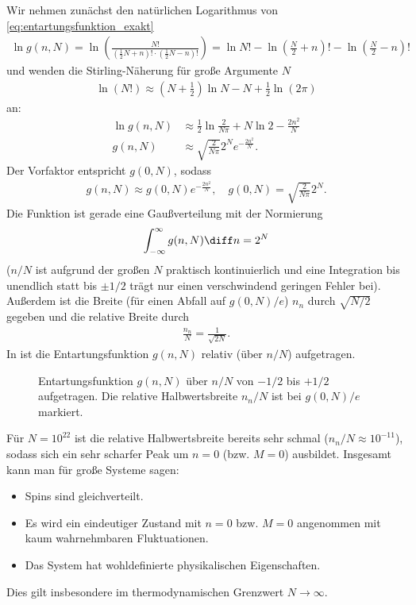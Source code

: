 Wir nehmen zunächst den natürlichen Logarithmus von \eqref{eq:entartungsfunktion_exakt}
\begin{align*}
    \ln g(n,N) = \ln \left( \frac{N!}{\left(\frac{1}{2}N+n\right)!\cdot \left( \frac{1}{2}N-n \right)!} \right) = \ln N! - \ln\left( \frac{N}{2}+n \right)!- \ln\left( \frac{N}{2}-n \right)!
\end{align*}
und wenden die Stirling-Näherung für große Argumente $N$
\begin{align*}
    \ln (N!) \approx \left( N+\frac{1}{2} \right)\ln N-N+\frac{1}{2}\ln(2\pi )
\end{align*}
an:
\begin{align*}
    \ln g(n,N) & \approx \frac{1}{2}\ln\frac{2}{N\pi}+N\ln 2-\frac{2n^2}{N} \\
    g(n,N)     & \approx \sqrt{\frac{2}{N\pi }}2^N e^{-\frac{2n^2}{N}}.
\end{align*}
Der Vorfaktor entspricht $g(0,N)$, sodass
\begin{align}
    \label{eq:entartungsfunktion_naeherung}
    g(n,N) \approx g(0,N) e^{-\frac{2n^2}{N}}, \quad g(0,N) =  \sqrt{\frac{2}{N\pi }}2^N.
\end{align}
Die Funktion ist gerade eine Gaußverteilung mit der Normierung
\begin{align*}
    \int_{-\infty}^{\infty} g(n,N)\diff n=2^N
\end{align*}
($n/N$ ist aufgrund der großen $N$ praktisch kontinuierlich und eine Integration bis unendlich statt bis $\pm 1/2$ trägt nur einen verschwindend geringen Fehler bei). Außerdem ist die Breite (für einen Abfall auf $g(0,N)/e$) $n_n$ durch $\sqrt{N/2}$ gegeben und die relative Breite durch
\begin{align}
    \label{eq:relative_breite}
    \frac{n_n}{N} = \frac{1}{\sqrt{2N}}.
\end{align}
In  ist die Entartungsfunktion $g(n,N)$ relativ (über $n/N$) aufgetragen.

\begin{figure}[htbp]
    \centering
    \tfigDegeneracyFunctionGauss
    \caption{Entartungsfunktion $g(n,N)$ über $n/N$ von $-1/2$ bis $+1/2$ aufgetragen. Die relative Halbwertsbreite $n_n/N$ ist bei $g(0,N)/e$ markiert. }
    \label{fig:DegeneracyFunctionGauss}
\end{figure}

Für $N=10^{22}$ ist die relative Halbwertsbreite bereits sehr schmal ($n_n/N\approx 10^{-11}$), sodass sich ein sehr scharfer Peak um $n=0$ (bzw. $M=0$) ausbildet. Insgesamt kann man für große Systeme sagen:
\begin{itemize}
    \item Spins sind gleichverteilt.
    \item Es wird ein eindeutiger Zustand mit $n=0$ bzw. $M=0$ angenommen mit kaum wahrnehmbaren Fluktuationen.
    \item Das System hat wohldefinierte physikalischen Eigenschaften.
\end{itemize}
Dies gilt insbesondere im thermodynamischen Grenzwert $N\rightarrow\infty$.


